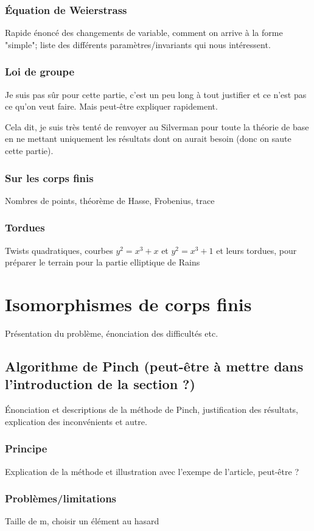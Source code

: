 \documentclass[a4paper]{article} %
\numberwithin{equation}{section}
\begin{document}
\subsubsection{Équation de Weierstrass}
Rapide énoncé des changements de variable, comment on arrive à la forme
"simple"; liste des différents paramètres/invariants qui nous intéressent.
\subsubsection{Loi de groupe}
Je suis pas sûr pour cette partie, c'est un peu long à tout justifier et ce
n'est pas ce qu'on veut faire. Mais peut-être expliquer rapidement.\par
Cela dit, je suis très tenté de renvoyer au Silverman pour toute la théorie de
base en ne mettant uniquement les résultats dont on aurait besoin (donc on saute
cette partie).
\subsubsection{Sur les corps finis}
Nombres de points, théorème de Hasse, Frobenius, trace
\subsubsection{Tordues}
Twists quadratiques, courbes $y^2 = x^3 + x$ et $y^2 = x^3 + 1$ et leurs
tordues, pour préparer le terrain pour la partie elliptique de Rains


\section{Isomorphismes de corps finis}
Présentation du problème, énonciation des difficultés etc.

\subsection{Algorithme de Pinch (peut-être à mettre dans l'introduction de 
la section ?)}
Énonciation et descriptions de la méthode de Pinch, justification des 
résultats, explication des inconvénients et autre.
\subsubsection{Principe}
Explication de la méthode et illustration avec l'exempe de l'article, peut-être
?
\subsubsection{Problèmes/limitations}
Taille de m, choisir un élément au hasard
\end{document}
